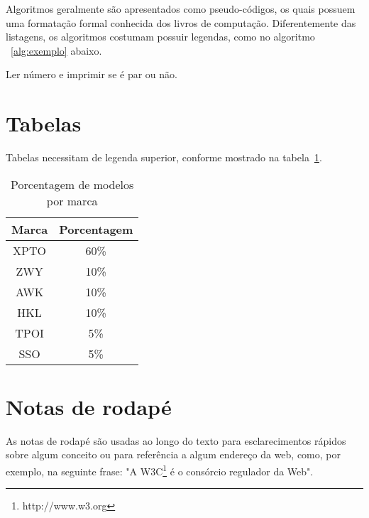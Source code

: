 \documentclass[a4paper,12pt]{monografia}
\theoremstyle{plain}
\theoremstyle{definition}
\theoremstyle{remark}
\begin{document}
 Algoritmos geralmente são apresentados como pseudo-códigos, os quais possuem uma formatação formal conhecida dos livros de computação. Diferentemente das listagens, os algoritmos costumam possuir legendas, como no algoritmo ~\ref{alg:exemplo} abaixo.

\begin{algorithm}
\label{alg:exemplo}
 \caption{Ler número e imprimir se é par ou não.}

\end{algorithm}


\section{Tabelas}

Tabelas necessitam de legenda superior, conforme mostrado na tabela~\ref{tab:modelos}.

\begin{table}[ht]
   \centering
   \caption{Porcentagem de modelos por marca}
   \label{tab:modelos}
   \begin{tabular}{| c | c |}
      \hline 
      Marca & Porcentagem \\
      \hline \hline 
      XPTO & 60\% \\
      \hline
      ZWY & 10\% \\
      \hline
      AWK & 10\% \\
      \hline
      HKL & 10\% \\
      \hline
      TPOI & 5\% \\
      \hline
      SSO & 5\% \\
      \hline
   \end{tabular} 
\end{table}

\section{Notas de rodapé}
As notas de rodapé são usadas ao longo do texto para esclarecimentos rápidos sobre algum conceito ou para referência a algum endereço da web, como, por exemplo, na seguinte frase: "A W3C\footnote{http://www.w3.org} é o consórcio regulador da Web".
\end{document}
